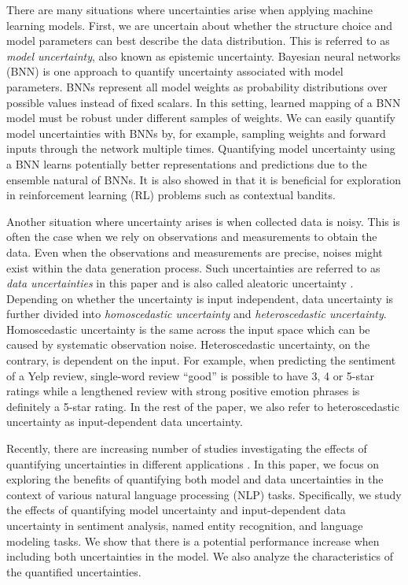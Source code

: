 \documentclass[letterpaper]{article} %
\begin{document}
There are many situations where uncertainties arise when applying machine learning models. First, we are uncertain about whether the structure choice and model parameters can best describe the data distribution. This is referred to as \textit{model uncertainty}, also known as epistemic uncertainty. Bayesian neural networks (BNN) \cite{buntine1991bayesian,denker1991transforming,mackay1992practical,mackay1995probable,neal2012bayesian} is one approach to quantify uncertainty associated with model parameters. BNNs represent all model weights as probability distributions over possible values instead of fixed scalars. In this setting, learned mapping of a BNN model must be robust under different samples of weights. We can easily quantify model uncertainties with BNNs by, for example, sampling weights and forward inputs through the network multiple times. Quantifying model uncertainty using a BNN learns potentially better representations and predictions due to the ensemble natural of BNNs. It is also showed in \cite{blundell2015weight} that it is beneficial for exploration in reinforcement learning (RL) problems such as contextual bandits.

Another situation where uncertainty arises is when collected data is noisy. This is often the case when we rely on observations and measurements to obtain the data. Even when the observations and measurements are precise, noises might exist within the data generation process. Such uncertainties are referred to as \textit{data uncertainties} in this paper and is also called aleatoric uncertainty \cite{der2009aleatory}. Depending on whether the uncertainty is input independent, data uncertainty is further divided into \textit{homoscedastic uncertainty} and \textit{heteroscedastic uncertainty}. Homoscedastic uncertainty is the same across the input space which can be caused by systematic observation noise. Heteroscedastic uncertainty, on the contrary, is dependent on the input. For example, when predicting the sentiment of a Yelp review, single-word review ``good'' is possible to have 3, 4 or 5-star ratings while a lengthened review with strong positive emotion phrases is definitely a 5-star rating. In the rest of the paper, we also refer to heteroscedastic uncertainty as input-dependent data uncertainty.

Recently, there are increasing number of studies investigating the effects of quantifying uncertainties in different applications \cite{kendall2015bayesian,gal2016theoretically,kendall2017uncertainties,zhu2017deep}. In this paper, we focus on exploring the benefits of quantifying both model and data uncertainties in the context of various natural language processing (NLP) tasks. Specifically, we study the effects of quantifying model uncertainty and input-dependent data uncertainty in sentiment analysis, named entity recognition, and language modeling tasks. We show that there is a potential performance increase when including both uncertainties in the model. We also analyze the characteristics of the quantified uncertainties.
\end{document}

